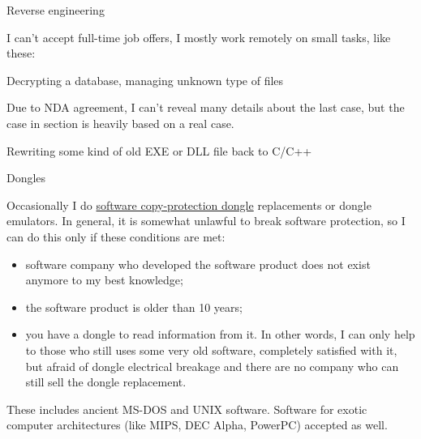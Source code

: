 \iffalse
\Large Need documentation? \normalsize

I could try to write a documentation/reference/manual for some API, language, framework, etc.

Sometimes I'm good at finding concise and clear example for each API/language feature.
This book is an example of it.
I can try to do this in long and steady fashion.

On the other side, my English is far from fluent.
And I may need a long time for diving deep into product unknown to me.

But I'll glad to rework existing documentation project.

Example of reference I admire is Wolfram Mathematica one: \url{http://reference.wolfram.com/language/}.
\fi

\Large Reverse engineering \normalsize

I can't accept full-time job offers, I mostly work remotely on small tasks, like these:

\large Decrypting a database, managing unknown type of files \normalsize

Due to NDA agreement, I can't reveal many details about the last case, but the case in  section
is heavily based on a real case.

\large Rewriting some kind of old EXE or DLL file back to C/C++ \normalsize

\large Dongles \normalsize

Occasionally I do \href{https://en.wikipedia.org/wiki/Software_protection_dongle}{software copy-protection dongle} replacements or dongle emulators. In general, it is somewhat unlawful to break software protection, so I can do this only if these conditions are met:

\begin{itemize}
\item software company who developed the software product does not exist anymore to my best knowledge;
\item the software product is older than 10 years;
\item you have a dongle to read information from it. In other words, I can only help to those who still uses some very old software, completely satisfied with it, but afraid of dongle electrical breakage and there are no company who can still sell the dongle replacement. 
\end{itemize}

These includes ancient MS-DOS and UNIX software. Software for exotic computer architectures (like MIPS, DEC Alpha, PowerPC) accepted as well.

